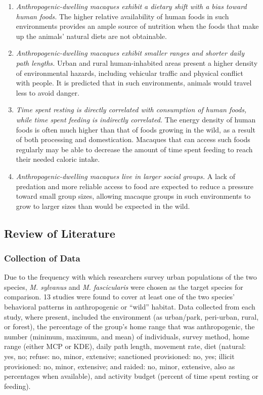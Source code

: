 \documentclass{../../../coursework}
\begin{document}
\begin{enumerate}

    \item \emph{Anthropogenic-dwelling macaques exhibit a dietary shift with a
    bias toward human foods.} The higher relative availability of human foods
    in such environments provides an ample source of nutrition when the foods
    that make up the animals' natural diets are not obtainable.
    
    \item \emph{Anthropogenic-dwelling macaques exhibit smaller ranges and
    shorter daily path lengths.} Urban and rural human-inhabited areas present
    a higher density of environmental hazards, including vehicular traffic and
    physical conflict with people. It is predicted that in such environments,
    animals would travel less to avoid danger.
    
    \item \emph{Time spent resting is directly correlated with consumption of
    human foods, while time spent feeding is indirectly correlated.} The
    energy density of human foods is often much higher than that of foods
    growing in the wild, as a result of both processing and domestication.
    Macaques that can access such foods regularly may be able to decrease the
    amount of time spent feeding to reach their needed caloric intake.
    
    \item \emph{Anthropogenic-dwelling macaques live in larger social groups.}
    A lack of predation and more reliable access to food are expected to
    reduce a pressure toward small group sizes, allowing macaque groups in
    such environments to grow to larger sizes than would be expected in the
    wild.
    
\end{enumerate}
    
\subsection{Review of Literature}

\subsubsection{Collection of Data}

Due to the frequency with which researchers survey urban populations of the
two species, \textit{M. sylvanus} and \textit{M. fascicularis} were chosen as
the target species for comparison. 13 studies were found to cover at least one
of the two species' behavioral patterns in anthropogenic or ``wild'' habitat.
Data collected from each study, where present, included the environment
(as urban/park, peri-urban, rural, or forest), the percentage of the group's
home range that was anthropogenic, the number (minimum, maximum, and mean) of
individuals, survey method, home range (either MCP or KDE), daily path length,
movement rate, diet (natural: yes, no; refuse: no, minor, extensive;
sanctioned provisioned: no, yes; illicit provisioned: no, minor, extensive;
and raided: no, minor, extensive, also as percentages when available), and
activity budget (percent of time spent resting or feeding).
\end{document}

